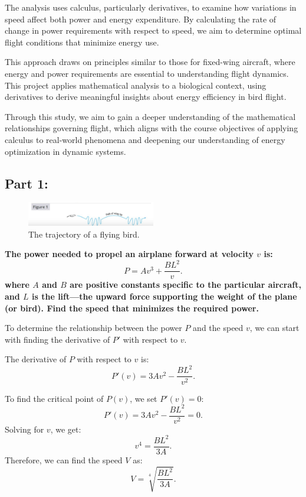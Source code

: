 \documentclass{article}
\begin{document}
The analysis uses calculus, particularly derivatives, to examine how variations in speed affect both power and energy expenditure. By calculating the rate of change in power requirements with respect to speed, we aim to determine optimal flight conditions that minimize energy use.

This approach draws on principles similar to those for fixed-wing aircraft, where energy and power requirements are essential to understanding flight dynamics. This project applies mathematical analysis to a biological context, using derivatives to derive meaningful insights about energy efficiency in bird flight.

Through this study, we aim to gain a deeper understanding of the mathematical relationships governing flight, which aligns with the course objectives of applying calculus to real-world phenomena and deepening our understanding of energy optimization in dynamic systems.
\newpage


\subsection*{Part 1:}
\begin{figure}[h]
    \centering
    \includegraphics[width=0.5\textwidth]{bird.png}
    \caption{\small The trajectory of a flying bird.}
    \label{fig:bird}
\end{figure}

{\large \bfseries The power needed to propel an airplane forward at velocity \( v \) is: 
}\[
P = Av^3 + \frac{BL^2}{v}.
\]
{\large \bfseries where \( A \) and \( B \) are positive constants specific to the particular aircraft, and \( L \) is the lift—the upward force supporting the weight of the plane (or bird). Find the speed that minimizes the required power.}
\setlength{\parskip}{2em}

To determine the relationship between the power \(P\) and the speed \(v\), we can start with finding the derivative of \(P'\) with respect to \(v\).

The derivative of \( P \) with respect to \( v \) is:
\[
P'(v) = 3Av^2 - \frac{BL^2}{v^2}.
\]

To find the critical point of \( P(v) \), we set \( P'(v) = 0 \):
\[
P'(v) = 3Av^2 - \frac{BL^2}{v^2} = 0.
\]
Solving for \( v \), we get:
\[
v^4 = \frac{BL^2}{3A}.
\]
Therefore, we can find the speed \( V \) as:
\[
V = \sqrt[4]{\frac{BL^2}{3A}}.
\]
\end{document}
